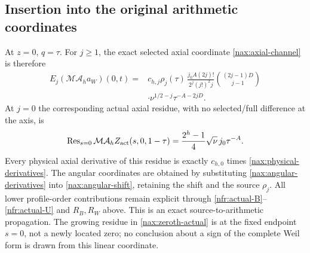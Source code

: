 \subsection{Insertion into the original arithmetic coordinates}

At $z=0$, $q=\tau$. For $j\geq1$, the exact selected axial coordinate
\eqref{nax:axial-channel} is therefore
\begin{equation}\label{nax:explicit-arithmetic}
 \begin{split}
 E_j(\mathcal M\mathcal A_h a_W)(0,t)
  ={}&c_{h,j}\rho_j(\tau)\,
  \frac{j_0A(2j)!}{2^j(j!)^2j}
     { (2j-1)D\choose j-1}\\
 &\cdot\nu^{1/2-j}\tau^{-A-2jD}.
 \end{split}
\end{equation}
At $j=0$ the corresponding actual axial residue, with no selected/full
difference at the axis, is
\begin{equation}\label{nax:zeroth-actual}
 \operatorname{Res}_{s=0}
  \mathcal M\mathcal A_h Z_{\rm act}(s,0,1-\tau)
   =\frac{2^h-1}{4}\sqrt\nu\,j_0\tau^{-A}.
\end{equation}
Every physical axial derivative of this residue is exactly $c_{h,0}$
times \eqref{nax:physical-derivatives}. The angular coordinates are
obtained by substituting \eqref{nax:angular-derivatives} into
\eqref{nax:angular-shift}, retaining the shift and the source $\rho_j$.
All lower profile-order contributions remain explicit through
\eqref{nfr:actual-B}--\eqref{nfr:actual-U} and $R_B,R_W$ above.
This is an exact source-to-arithmetic propagation. The growing residue
in \eqref{nax:zeroth-actual} is at the fixed endpoint $s=0$, not a newly
located zero; no conclusion about a sign of the complete Weil form is
drawn from this linear coordinate.
